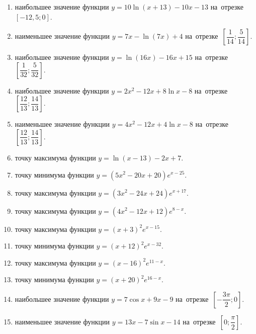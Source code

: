 \documentclass[a4paper,10pt]{article}
\begin{document}
\begin{enumerate}
\item {} наибольшее значение функции $y = 10\ln \left(x+13\right)-10x -13$ на~отрезке~$\left[-12,5;0\right]$.

\item {} наименьшее значение функции $y = 7x-\ln \left(7x\right)+4$ на~отрезке~$\left[\dfrac{1}{14};\dfrac{5}{14}\right]$.

\item {} наибольшее значение функции $y = \ln \left(16x\right)-16x+15$ на~отрезке~$\left[\dfrac{1}{32};\dfrac{5}{32}\right]$.

\item {} наибольшее значение функции $y=2x^2-12x+8\ln x-8$ на~отрезке~$\left[\dfrac{12}{13};\dfrac{14}{13}\right]$.

\item {} наименьшее значение функции $y=4x^2-12x+4\ln x-8$ на~отрезке~$\left[\dfrac{12}{13};\dfrac{14}{13}\right]$.

\item {} точку максимума функции $y=\ln \left(x-13\right)-2x+7$.

\item {} точку минимума функции $y=\left(5x^2-20x+20\right)e^{x-25}$.

\item {} точку максимума функции $y=\left(3x^2-24x+24\right)e^{x+17}$.

\item {} точку максимума функции $y=\left(4x^2-12x+12\right)e^{8-x}$.

\item {} точку максимума функции $y=\left(x +3\right)^2e^{x-15}$.

\item {} точку минимума функции $y=\left(x +12\right)^2e^{x-32}$.

\item {} точку максимума функции $y=\left(x -16\right)^2e^{11-x}$.

\item {} точку минимума функции $y=\left(x +20\right)^2e^{16-x}$.

\item {} наибольшее значение функции $y=7\cos x+9x -9$ на~отрезке~$\left[-\dfrac{3\pi }{2};0\right]$.

\item {} наименьшее значение функции $y=13x-7\sin x -14$ на~отрезке~$\left[0;\dfrac{\pi }{2}\right]$.


\end{enumerate}
\end{document}

